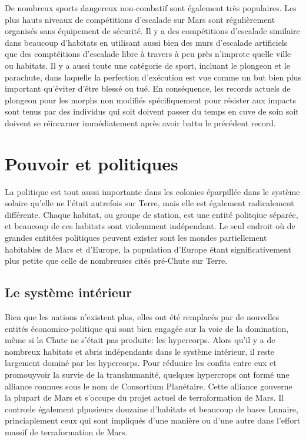                De nombreux sports dangereux non-combatif sont également très populaires. Les plus hauts niveaux de compétitions d'escalade sur Mars sont régulièrement organisés sans équipement de sécurité. Il y a des compétitions d'escalade similaire dans beaucoup d'habitats en utilisant aussi bien des murs d'escalade artificiels que des comptéitions d'escalade libre à travers à peu près n'improte quelle ville ou habitats. Il y a aussi toute une catégorie de sport, incluant le plongeon et le parachute, dans laquelle la perfection d'exécution est vue comme un but bien plus important qu'éviter d'être blessé ou tué. En conséquence, les records actuels de plongeon pour les morphs non modifiés spécifiquement pour résister aux impacts sont tenus par des individus qui soit doivent passer du temps en cuve de soin soit doivent se réincarner immédiatement après avoir battu le précédent record. 

               \section{Pouvoir et politiques} \label{sec:politics-power} 

               La politique est tout aussi importante dans les colonies éparpillée dans le système solaire qu'elle ne l'était autrefois sur Terre, mais elle est également radicalement différente. Chaque habitat, ou groupe de station, est une entité politqiue séparée, et beaucoup de ces habitats sont violemment indépendant. Le seul endroit où de grandes entitées politiques peuvent exister sont les mondes partiellement habitables de Mars et d'Europe, la population d'Europe étant significativement plus petite que celle de nombreuses cités pré-Chute sur Terre. 

               \subsection{Le système intérieur} \label{sec:inner-system} 

               Bien que les nations n'existent plus, elles ont été remplacés par de nouvelles entités économico-politique qui sont bien engagée sur la voie de la domination, même si la Chute ne s'était pas produite: les hypercorps. Alors qu'il y a de nombreux habitats et abris indépendants dans le système intérieur, il reste largement dominé par les hypercorps. Pour réduuire les confits entre  eux et promouyvoir la survie de la transhumanité, quelques hypercrops ont formé une alliance connues sous le nom de Consortium Planétaire. Cette alliance gouverne la plupart de Mars et s'occupe du projet actuel de terraformation de Mars. Il contrœle également plpusieurs douzaine d'habitats et beaucoup de bases Lunaire, princiaplement ceux qui sont impliqués d'une manière ou d'une autre dans l'effort massif de terraformation de Mars. 

